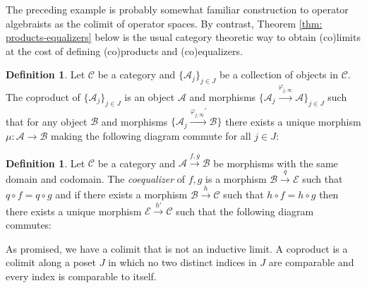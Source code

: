 \documentclass[12pt]{article}
\theoremstyle{definition}
\newtheorem{definition}[theorem]{Definition}
\newenvironment{remark}
  {\pushQED{\qed}\renewcommand{\qedsymbol}{\textcircled{\tiny R}}\remarkx}
  {\popQED\endremarkx}
\newcommand{\mc}[1]{\mathcal{#1}}
\newcommand{\<}{\langle}
\renewcommand{\>}{\rangle}
\begin{document}
The preceding example is probably somewhat familiar construction to operator algebraists as the colimit of operator spaces. By contrast, Theorem \ref{thm: products-equalizers} below is the usual category theoretic way to obtain (co)limits at the cost of defining (co)products and (co)equalizers.

\begin{definition} 
    Let $\mc C$ be a category and $\{\mc A_j\}_{j \in J}$ be a collection of objects in $\mc C$. The coproduct of $\{\mc A_j\}_{j \in J}$ is an object $\mc A$ and morphisms $\{\mc A_j \overset{\varphi_{j,\infty}}{\to} \mc A\}_{j \in J}$ such that for any object $\mc B$ and morphisms $\{\mc A_j \overset{\varphi_{j,\infty}'}{\to} \mc B\}$ there exists a unique morphism $\mu: \mc A \to \mc B$ making the following diagram commute for all $j \in J$:
    \begin{center}
    \end{center}
\end{definition}

\begin{definition} 
    Let $\mc C$ be a category and $\mc A \overset{f,g}{\to} \mc B$ be morphisms with the same domain and codomain. The \textit{coequalizer} of $f,g$ is a morphism $\mc B \overset{q}{\to} \mc E$ such that $q \circ f = q\circ g$ and if there exists a morphism $\mc B \overset{h}{\to} \mc C$ such that $h \circ f = h \circ g$ then there exists a unique morphism $\mc E \overset{h'}{\to} \mc C$ such that the following diagram commutes:
    \begin{center}
    \end{center}
\end{definition}

\begin{remark}
    As promised, we have a colimit that is not an inductive limit. A coproduct is a colimit along a poset $J$ in which no two distinct indices in $J$ are comparable and every index is comparable to itself.
\end{remark}
\end{document}
